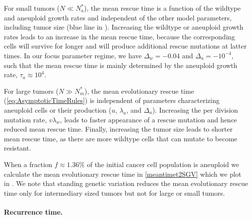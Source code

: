 \documentclass[12pt]{extarticle}
\begin{document}
For small tumors ($ N \ll N_a^*$), the mean rescue time is a function of the wildtype and aneuploid growth rates and independent of the other model parameters, including tumor size (blue line in ).
Increasing the wildtype or aneuploid growth rates leads to an increase in the mean rescue time, because the corresponding cells will survive for longer and will produce additional rescue mutations at latter times.
In our focus parameter regime, we have $\Delta_w=-0.04$ and $\Delta_a=-10^{-4}$, such that the mean rescue time is mainly determined by the aneuploid growth rate, $\tau_a \approx 10^4$.

For large tumors ($N \gg N_m^*$), the mean evolutionary rescue time (\cref{eq:AsymptoticTimeRules}) is independent of parameters characterizing aneuploid cells or their production ($u$, $\lambda_a$, and $\Delta_a$). %
 Increasing the per division mutation rate, $v\lambda_w$, leads to faster appearance of a rescue mutation and hence reduced mean rescue time. 
Finally, increasing the tumor size leads to shorter mean rescue time, as there are more wildtype cells that can mutate to become resistant. 

When a fraction $f\approx 1.36\%$ of the initial cancer cell population is aneuploid we calculate the mean evolutionary rescue time in \cref{meantimet2SGV} which we plot in . We note that standing genetic variation reduces the mean evolutionary rescue time only for intermediary sized tumors but not for large or small tumors.
\paragraph{Recurrence time.}
\end{document}
